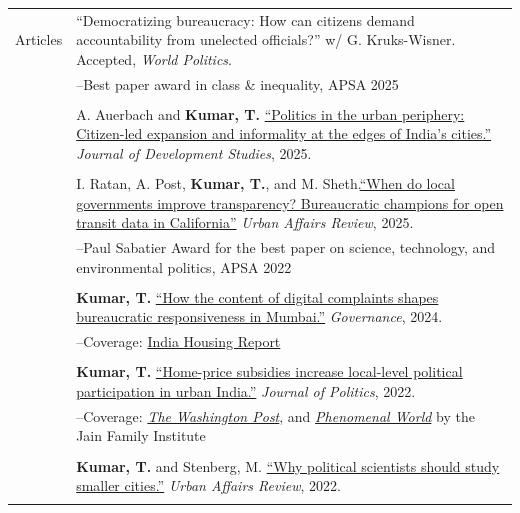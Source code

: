 \documentclass[letterpaper, 10.5pt]{article}
\begin{document}
\begin{longtable}{p{1.5in}p{5in}}
\nohyphens{{Articles}} 

&``Democratizing bureaucracy: How can citizens demand accountability from unelected officials?'' w/ G. Kruks-Wisner. Accepted, \textit{World Politics}.\\



&--\indent  Best paper award in class \& inequality, APSA 2025\\
& \\
& A. Auerbach and \textbf{Kumar, T.} \href{https://doi.org/10.1080/00220388.2025.2521492}{``Politics in the urban periphery: Citizen-led expansion and informality at the edges of India's cities.''} \textit{Journal of Development Studies}, 2025.\\
& \\

& I. Ratan, A. Post, \textbf{Kumar, T.}, and M. Sheth.\href{https://journals.sagepub.com/doi/full/10.1177/10780874251357506}{``When do local governments improve transparency? 
Bureaucratic champions for open transit data in California''}  \textit{Urban Affairs Review}, 2025.\\

&--\indent Paul Sabatier Award for the best paper on science, technology, and environmental politics, APSA 2022\\


& \\

&\textbf{Kumar, T.} \href{https://onlinelibrary.wiley.com/doi/10.1111/gove.12889}{``How the content of digital complaints shapes bureaucratic responsiveness in Mumbai.''}   \textit{\textit{Governance}}, 2024. \\
&--\indent Coverage: \href{https://indiahousingreport.in/outputs/opinion/how-the-content-of-demands-shapes-government-responsiveness-excerpts-from-a-discussion/}{India Housing Report}\\
& \\
& \textbf{Kumar, T.} \href{https://doi.org/10.1086/715605}{``Home-price subsidies increase local-level political participation in urban India.''} \textit{Journal of Politics}, 2022.\\
& --\indent Coverage: \href{https://www.washingtonpost.com/news/monkey-cage/wp/2019/01/31/heres-what-gavin-newsom-elizabeth-warren-and-microsoft-should-know-if-want-to-end-the-affordable-housing-crisis/?tid=sm_tw_cage}{\textit{The Washington Post}}, and \href{https://www.phenomenalworld.org/sources/original-and-forgery/}{\textit{Phenomenal World}} by the Jain Family Institute  \\
& \\
& \textbf{Kumar, T.} and Stenberg, M. \href{https://doi.org/10.1177/10780874221124610}{``Why political scientists should study smaller cities.''}  \textit{Urban Affairs Review}, 2022. \\
& \\


\end{longtable}
\end{document}

